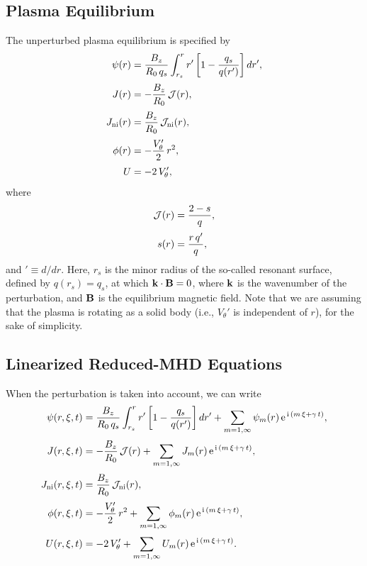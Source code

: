 \documentclass[12pt,prb,aps]{revtex4-1}
\begin{document}
\subsection{Plasma Equilibrium}
The unperturbed plasma equilibrium is specified by 
\begin{align}
\psi(r) &= \frac{B_z}{R_0\,q_s}\int_{r_s}^r r'\left[1- \frac{q_s}{q(r')}\right]dr',\\[0.5ex]
J(r) &= -\frac{B_z}{R_0}\,{\cal J}(r),\\[0.5ex]
J_{\rm ni}(r)&= \frac{B_z}{R_0}\,{\cal J}_{\rm ni}(r),\\[0.5ex]
\phi(r)&= - \frac{V_\theta'}{2}\,r^2,\\[0.5ex]
U &= - 2\,V_\theta',
\end{align}
where
\begin{align}
{\cal J}(r) &= \frac{2-s}{q},\\[0.5ex]
s(r) &= \frac{r\,q'}{q},
\end{align}
and $'\equiv d/dr$. Here, $r_s$ is the minor radius of the so-called resonant surface, defined by $q(r_s)=q_s$,
at which ${\bf k}\cdot{\bf B}=0$, where ${\bf k}$ is the wavenumber of the perturbation, and ${\bf B}$ is the equilibrium magnetic field. Note that we are assuming that the plasma is rotating as a solid body (i.e., $V_\theta'$ is independent of $r$), for the sake of simplicity. 

\subsection{Linearized Reduced-MHD Equations}
When the  perturbation is taken into account,
we can write
\begin{align}\label{e16}
\psi(r,\xi,t) &= \frac{B_z}{R_0\,q_s}\int_{r_s}^r r'\left[1- \frac{q_s}{q(r')}\right]dr' + \sum_{m=1,\infty}\psi_m(r)\,{\rm e}^{\,{\rm i}\,(m\,\xi+\gamma\,t)},
\\[0.5ex]
J(r,\xi,t) &= -\frac{B_z}{R_0}\,{\cal J}(r) +  \sum_{m=1,\infty}J_m(r)\,{\rm e}^{\,{\rm i}\,(m\,\xi+\gamma\,t)},\\[0.5ex]
J_{\rm ni}(r,\xi,t)&= \frac{B_z}{R_0}\,{\cal J}_{\rm ni}(r),\\[0.5ex]
\phi(r,\xi,t) &= - \frac{V_\theta'}{2}\,r^2 +  \sum_{m=1,\infty}\phi_m(r)\,{\rm e}^{\,{\rm i}\,(m\,\xi+\gamma\,t)},\\[0.5ex]
U(r,\xi,t) &= -2\,V_\theta' + \sum_{m=1,\infty}U_m(r)\,{\rm e}^{\,{\rm i}\,(m\,\xi+\gamma\,t)}.\label{e19}
\end{align}
\end{document}
